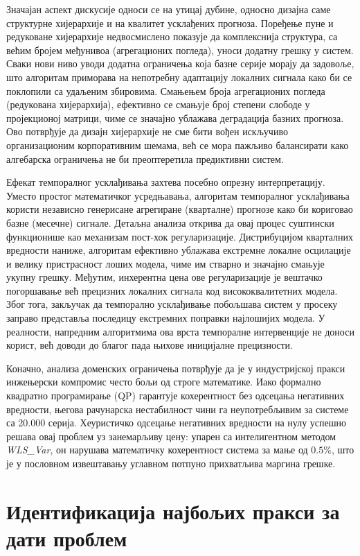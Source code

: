 \documentclass[12pt,oneside]{memoir}
\begin{document}
Значајан аспект дискусије односи се на утицај дубине, односно дизајна саме структурне хијерархије и на квалитет усклађених прогноза. Поређење пуне и редуковане хијерархије недвосмислено показује да комплекснија структура, са већим бројем међунивоа (агрегационих погледа), уноси додатну грешку у систем. Сваки нови ниво уводи додатна ограничења која базне серије морају да задовоље, што алгоритам приморава на непотребну адаптацију локалних сигнала како би се поклопили са удаљеним збировима. Смањењем броја агрегационих погледа (редукована хијерархија), ефективно се смањује број степени слободе у пројекционој матрици, чиме се значајно ублажава деградација базних прогноза. Ово потврђује да дизајн хијерархије не сме бити вођен искључиво организационим корпоративним шемама, већ се мора пажљиво балансирати како алгебарска ограничења не би преоптеретила предиктивни систем.

Ефекат темпоралног усклађивања захтева посебно опрезну интерпретацију. Уместо простог математичког усредњавања,  алгоритам темпоралног усклађивања користи независно генерисане агрегиране (кварталне) прогнозе како би кориговао базне (месечне) сигнале. Детаљна анализа открива да овај процес суштински функционише као механизам пост-хок регуларизације. Дистрибуцијом кварталних вредности наниже, алгоритам ефективно ублажава екстремне локалне осцилације и велику пристрасност лоших модела, чиме им стварно и значајно смањује укупну грешку. Међутим, инхерентна цена ове регуларизације је вештачко погоршавање већ прецизних локалних сигнала код висококвалитетних модела. Због тога, закључак да темпорално усклађивање побољшава систем у просеку заправо представља последицу екстремних поправки најлошијих модела. У реалности, напредним алгоритмима ова врста темпоралне интервенције не доноси корист, већ доводи до благог пада њихове иницијалне прецизности.

Коначно, анализа доменских ограничења потврђује да је у индустријској пракси инжењерски компромис често бољи од строге математике. Иако формално квадратно програмирање (QP) гарантује кохерентност без одсецања негативних вредности, његова рачунарска нестабилност чини га неупотребљивим за системе са 20.000 серија. Хеуристичко одсецање негативних вредности на нулу успешно решава овај проблем уз занемарљиву цену: упарен са интелигентном методом \textit{WLS\_Var}, он нарушава математичку кохерентност система за мање од $0.5\%$, што је у пословном извештавању углавном потпуно прихватљива маргина грешке.

\section{Идентификација најбољих пракси за дати проблем}
\end{document}
